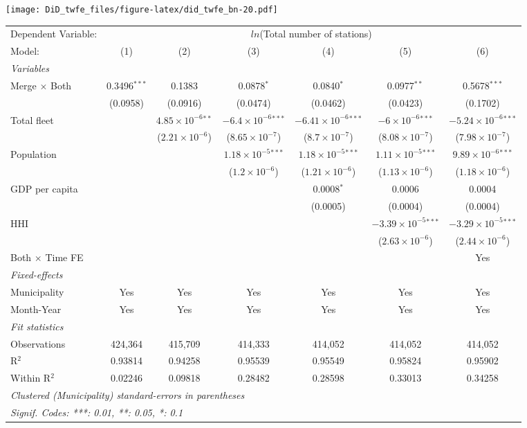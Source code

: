 \documentclass[
]{article}
\begin{document}
\texttt{[image: DiD\_twfe\_files/figure-latex/did\_twfe\_bn-20.pdf]}

\begin{tabular}{lcccccc}
\tabularnewline\midrule\midrule
Dependent Variable:&\multicolumn{6}{c}{$ln$(Total number of stations)}\\
Model:&(1) & (2) & (3) & (4) & (5) & (6)\\
\midrule \emph{Variables}&   &   &   &   &   &  \\
Merge $\times $ Both & 0.3496$^{***}$ & 0.1383 & 0.0878$^{*}$ & 0.0840$^{*}$ & 0.0977$^{**}$ & 0.5678$^{***}$\\
  &(0.0958) & (0.0916) & (0.0474) & (0.0462) & (0.0423) & (0.1702)\\
Total fleet &    & $4.85\times 10^{-6}$$^{**}$ & $-6.4\times 10^{-6}$$^{***}$ & $-6.41\times 10^{-6}$$^{***}$ & $-6\times 10^{-6}$$^{***}$ & $-5.24\times 10^{-6}$$^{***}$\\
  &   & ($2.21\times 10^{-6}$) & ($8.65\times 10^{-7}$) & ($8.7\times 10^{-7}$) & ($8.08\times 10^{-7}$) & ($7.98\times 10^{-7}$)\\
Population &    &    & $1.18\times 10^{-5}$$^{***}$ & $1.18\times 10^{-5}$$^{***}$ & $1.11\times 10^{-5}$$^{***}$ & $9.89\times 10^{-6}$$^{***}$\\
  &   &    & ($1.2\times 10^{-6}$) & ($1.21\times 10^{-6}$) & ($1.13\times 10^{-6}$) & ($1.18\times 10^{-6}$)\\
GDP per capita &    &    &    & 0.0008$^{*}$ & 0.0006 & 0.0004\\
  &   &    &    & (0.0005) & (0.0004) & (0.0004)\\
HHI &    &    &    &    & $-3.39\times 10^{-5}$$^{***}$ & $-3.29\times 10^{-5}$$^{***}$\\
  &   &    &    &    & ($2.63\times 10^{-6}$) & ($2.44\times 10^{-6}$)\\
Both $\times$ Time FE &  &  &  &  &  & Yes\\
\midrule \emph{Fixed-effects}&   &   &   &   &   &  \\
Municipality & Yes & Yes & Yes & Yes & Yes & Yes\\
Month-Year & Yes & Yes & Yes & Yes & Yes & Yes\\
\midrule \emph{Fit statistics}&  & & & & & \\
Observations & 424,364&415,709&414,333&414,052&414,052&414,052\\
R$^2$ & 0.93814&0.94258&0.95539&0.95549&0.95824&0.95902\\
Within R$^2$ & 0.02246&0.09818&0.28482&0.28598&0.33013&0.34258\\
\midrule\midrule\multicolumn{7}{l}{\emph{Clustered (Municipality) standard-errors in parentheses}}\\
\multicolumn{7}{l}{\emph{Signif. Codes: ***: 0.01, **: 0.05, *: 0.1}}\\
\end{tabular}
\end{document}
